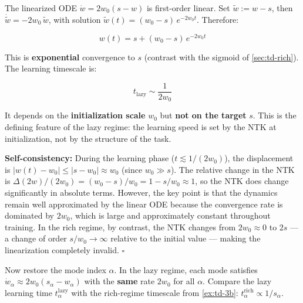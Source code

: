 \documentclass[11pt]{article}
\begin{document}
\begin{solution}[ex:td-4b]
The linearized ODE \(\dot{w} = 2w_0(s - w)\) is first-order
linear. Set \(\tilde{w} := w - s\), then
\(\dot{\tilde{w}} = -2w_0\,\tilde{w}\), with solution
\(\tilde{w}(t) = (w_0 - s)\,e^{-2w_0 t}\). Therefore:

\[\boxed{w(t) = s + (w_0 - s)\,e^{-2w_0 t}}\]

This is \textbf{exponential} convergence to \(s\) (contrast with the
sigmoid of \cref{sec:td-rich}). The learning timescale is:

\[t_{\text{lazy}} \sim \frac{1}{2w_0}\]

It depends on the \textbf{initialization scale} \(w_0\) but \textbf{not
on the target} \(s\). This is the defining feature of the lazy regime:
the learning speed is set by the NTK at initialization, not by the
structure of the task.

\textbf{Self-consistency:} During the learning phase
(\(t \lesssim 1/(2w_0)\)), the displacement is
\(|w(t) - w_0| \leq |s - w_0| \approx w_0\) (since \(w_0 \gg s\)). The
relative change in the NTK is
\(\Delta(2w)/(2w_0) = (w_0 - s)/w_0 = 1 - s/w_0 \approx 1\), so the NTK
does change significantly in absolute terms. However, the key point is
that the dynamics remain well approximated by the linear ODE because the
convergence rate is dominated by \(2w_0\), which is large and
approximately constant throughout training. In the rich regime, by
contrast, the NTK changes from \(2w_0 \approx 0\) to \(2s\) --- a change
of order \(s/w_0 \to \infty\) relative to the initial value --- making
the linearization completely invalid. \(\square\)
\end{solution}

\begin{exercise}
\label{ex:td-4c}
Now restore the mode
index \(\alpha\). In the lazy regime, each mode satisfies
\(\dot{w}_\alpha \approx 2w_0(s_\alpha - w_\alpha)\) with the
\textbf{same} rate \(2w_0\) for all \(\alpha\). Compare the lazy
learning time \(t_\alpha^{\text{lazy}}\) with the rich-regime timescale
from \cref{ex:td-3b}: \(t_\alpha^{\text{rich}} \propto 1/s_\alpha\).
\end{exercise}
\end{document}

